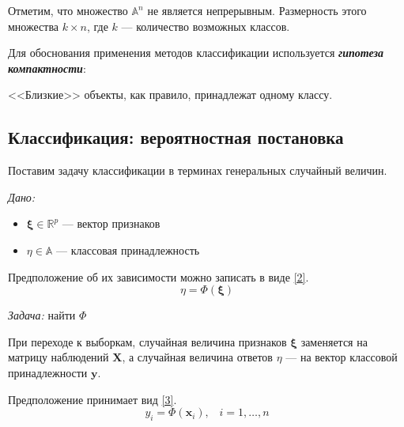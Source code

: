 \documentclass[11pt, oneside]{article}   	%
\begin{document}
		Отметим, что множество $\mathbb{A}^n$ не является непрерывным. Размерность этого множества $k\times n$, где $k$ --- количество возможных классов.
		
		Для обоснования применения методов классификации используется \textbf{\textit{гипотеза компактности}}:
		
		<<Близкие>> объекты, как правило, принадлежат одному классу.
		\newline



		\subsection{Классификация: вероятностная постановка}
		Поставим задачу классификации в терминах генеральных случайный величин.
		
		\textit{Дано:}
		\begin{itemize}
			\item $\bm{\xi} \in \mathbb{R}^p$ --- вектор признаков
			\item $\eta \in \mathbb{A}$ --- классовая принадлежность
		\end{itemize}
	
		Предположение об их зависимости можно записать в виде \ref{2}.
		\begin{equation}
			\eta = \Phi(\bm{\xi})
			\label{2}
		\end{equation}
		
		\textit{Задача:} найти $\Phi$
		
		При переходе к выборкам, случайная величина признаков $\bm{\xi}$ заменяется на матрицу наблюдений $\bm{X}$, а случайная величина ответов $\eta$ --- на вектор классовой принадлежности $\bm{y}$.
		
		Предположение принимает вид \ref{3}.
		\begin{equation}
			y_i = \Phi(\bm{x}_i),\;\;\; i = 1, \ldots, n
			\label{3}
		\end{equation}
		
\end{document}
